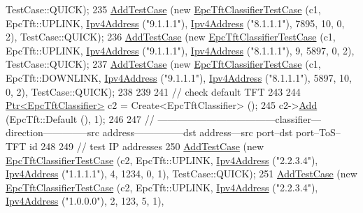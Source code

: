 \begin{DoxyCode}
      TestCase::QUICK);
235   \hyperlink{classns3_1_1TestCase_a3718088e3eefd5d6454569d2e0ddd835}{AddTestCase} (\textcolor{keyword}{new} \hyperlink{classEpcTftClassifierTestCase}{EpcTftClassifierTestCase} (c1, EpcTft::UPLINK,   
      \hyperlink{classns3_1_1Ipv4Address}{Ipv4Address} (\textcolor{stringliteral}{"9.1.1.1"}), \hyperlink{classns3_1_1Ipv4Address}{Ipv4Address} (\textcolor{stringliteral}{"8.1.1.1"}),  7895,       10,     0,    2), 
      TestCase::QUICK);
236   \hyperlink{classns3_1_1TestCase_a3718088e3eefd5d6454569d2e0ddd835}{AddTestCase} (\textcolor{keyword}{new} \hyperlink{classEpcTftClassifierTestCase}{EpcTftClassifierTestCase} (c1, EpcTft::UPLINK,   
      \hyperlink{classns3_1_1Ipv4Address}{Ipv4Address} (\textcolor{stringliteral}{"9.1.1.1"}), \hyperlink{classns3_1_1Ipv4Address}{Ipv4Address} (\textcolor{stringliteral}{"8.1.1.1"}),     9,     5897,     0,    2), 
      TestCase::QUICK);
237   \hyperlink{classns3_1_1TestCase_a3718088e3eefd5d6454569d2e0ddd835}{AddTestCase} (\textcolor{keyword}{new} \hyperlink{classEpcTftClassifierTestCase}{EpcTftClassifierTestCase} (c1, EpcTft::DOWNLINK, 
      \hyperlink{classns3_1_1Ipv4Address}{Ipv4Address} (\textcolor{stringliteral}{"9.1.1.1"}), \hyperlink{classns3_1_1Ipv4Address}{Ipv4Address} (\textcolor{stringliteral}{"8.1.1.1"}),  5897,       10,     0,    2), 
      TestCase::QUICK);
238 
239 
241   \textcolor{comment}{// check default TFT }
243 \textcolor{comment}{}
244   \hyperlink{classns3_1_1Ptr}{Ptr<EpcTftClassifier>} c2 = Create<EpcTftClassifier> ();
245   c2->\hyperlink{classns3_1_1EpcTftClassifier_a4a0dd2623dd9bfbfb806183625af74bd}{Add} (EpcTft::Default (), 1);
246 
247   \textcolor{comment}{// ------------------------------------classifier---direction--------------src address---------------dst
       address---src port--dst port--ToS--TFT id}
248 
249   \textcolor{comment}{// test IP addresses}
250   \hyperlink{classns3_1_1TestCase_a3718088e3eefd5d6454569d2e0ddd835}{AddTestCase} (\textcolor{keyword}{new} \hyperlink{classEpcTftClassifierTestCase}{EpcTftClassifierTestCase} (c2, EpcTft::UPLINK,   
      \hyperlink{classns3_1_1Ipv4Address}{Ipv4Address} (\textcolor{stringliteral}{"2.2.3.4"}), \hyperlink{classns3_1_1Ipv4Address}{Ipv4Address} (\textcolor{stringliteral}{"1.1.1.1"}),     4,     1234,     0,    1), 
      TestCase::QUICK);
251   \hyperlink{classns3_1_1TestCase_a3718088e3eefd5d6454569d2e0ddd835}{AddTestCase} (\textcolor{keyword}{new} \hyperlink{classEpcTftClassifierTestCase}{EpcTftClassifierTestCase} (c2, EpcTft::UPLINK,   
      \hyperlink{classns3_1_1Ipv4Address}{Ipv4Address} (\textcolor{stringliteral}{"2.2.3.4"}), \hyperlink{classns3_1_1Ipv4Address}{Ipv4Address} (\textcolor{stringliteral}{"1.0.0.0"}),     2,      123,     5,    1), 

\end{DoxyCode}
